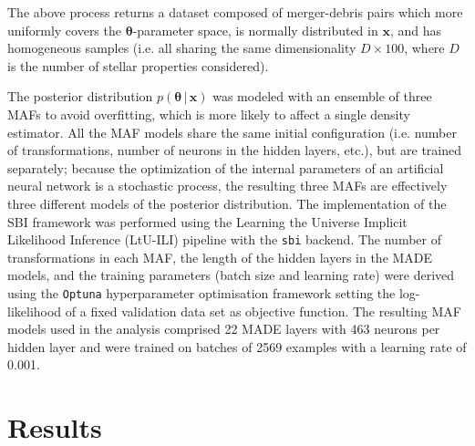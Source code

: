 The above process returns a dataset composed of merger-debris pairs which more uniformly covers the $\bm{\theta}$-parameter space, is normally distributed in $\bm{x}$, and has homogeneous samples (i.e. all sharing the same dimensionality $D\times100$, where $D$ is the number of stellar properties considered).

The posterior distribution $p(\bm{\theta} \, | \, \bm{x})$ was modeled with an ensemble of three MAFs to avoid overfitting, which is more likely to affect a single density estimator. All the MAF models share the same initial configuration (i.e. number of transformations, number of neurons in the hidden layers, etc.), but are trained separately; because the optimization of the internal parameters of an artificial neural network is a stochastic process, the resulting three MAFs are effectively three different models of the posterior distribution. The implementation of the SBI framework was performed using the Learning the Universe Implicit Likelihood Inference (LtU-ILI) pipeline \citep{Ho2024} with the \texttt{sbi} backend. The number of transformations in each MAF, the length of the hidden layers in the MADE models, and the training parameters (batch size and learning rate) were derived using the \texttt{Optuna} hyperparameter optimisation framework \citep{Akiba2019} setting the log-likelihood of a fixed validation data set as objective function. The resulting MAF models used in the analysis comprised 22 MADE layers with 463 neurons per hidden layer and were trained on batches of 2569 examples with a learning rate of 0.001. 





\section{Results}
\label{sec:results}



